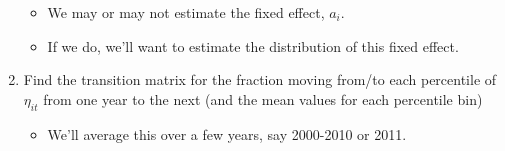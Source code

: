 \documentclass[article,11pt,letterpaper,fleqn]{article}
\theoremstyle{definition}
\numberwithin{equation}{section}
\begin{document}
\begin{enumerate}
\begin{itemize}
	\item We may or may not estimate the fixed effect, $a_{i}$.  
	\item If we do, we'll want to estimate the distribution of this fixed effect.
	\end{itemize}
\item Find the transition matrix for the fraction moving from/to each percentile of $\eta_{it}$ from one year to the next (and the mean values for each percentile bin) 
	\begin{itemize}
	\item We'll average this over a few years, say 2000-2010 or 2011.
	\end{itemize}
\end{enumerate}
\end{document}
